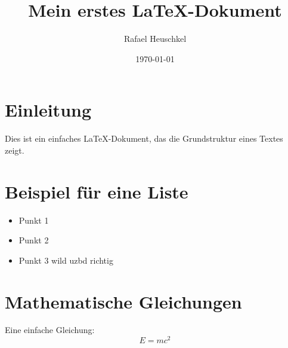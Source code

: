 \documentclass[a4paper, 12pt]{article}
\begin{document}
	
	\title{Mein erstes LaTeX-Dokument}
	\author{Rafael Heuschkel}
	\date{\today}
	
	\maketitle
	
	\section{Einleitung}
	Dies ist ein einfaches LaTeX-Dokument, das die Grundstruktur eines Textes zeigt.
	
	\section{Beispiel für eine Liste}
	\begin{itemize}
		\item Punkt 1
		\item Punkt 2
		\item Punkt 3 wild uzbd richtig
	\end{itemize}
	
	\section{Mathematische Gleichungen}
	Eine einfache Gleichung:
	\[
	E = mc^2
	\]
	
\end{document}

